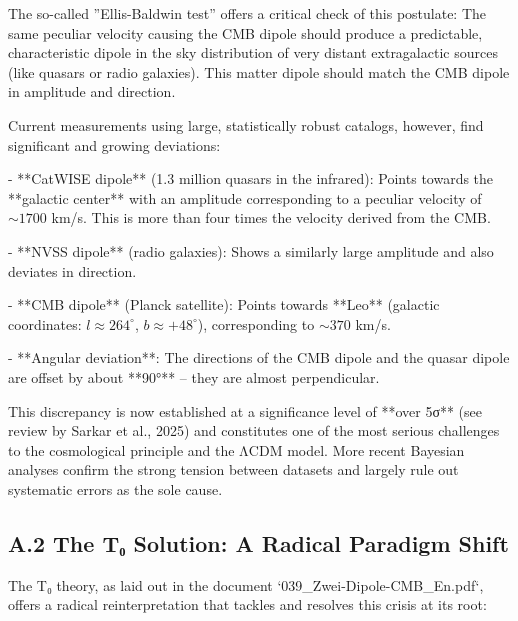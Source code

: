 	The so-called ''Ellis-Baldwin test'' offers a critical check of this postulate: The same peculiar velocity causing the CMB dipole should produce a predictable, characteristic dipole in the sky distribution of very distant extragalactic sources (like quasars or radio galaxies). This matter dipole should match the CMB dipole in amplitude and direction.
	
	Current measurements using large, statistically robust catalogs, however, find significant and growing deviations:
	
	- **CatWISE dipole** (1.3 million quasars in the infrared): Points towards the **galactic center** with an amplitude corresponding to a peculiar velocity of $\sim 1700$ km/s. This is more than four times the velocity derived from the CMB.
	
	- **NVSS dipole** (radio galaxies): Shows a similarly large amplitude and also deviates in direction.
	
	- **CMB dipole** (Planck satellite): Points towards **Leo** (galactic coordinates: $l \approx 264^\circ$, $b \approx +48^\circ$), corresponding to $\sim 370$ km/s.
	
	- **Angular deviation**: The directions of the CMB dipole and the quasar dipole are offset by about **90°** – they are almost perpendicular.
	
	This discrepancy is now established at a significance level of **over 5σ** (see review by Sarkar et al., 2025) and constitutes one of the most serious challenges to the cosmological principle and the ΛCDM model. More recent Bayesian analyses confirm the strong tension between datasets and largely rule out systematic errors as the sole cause.
	
	\subsection*{A.2 The T₀ Solution: A Radical Paradigm Shift}
	
	The T₀ theory, as laid out in the document `039\_Zwei-Dipole-CMB\_En.pdf`, offers a radical reinterpretation that tackles and resolves this crisis at its root:
	
